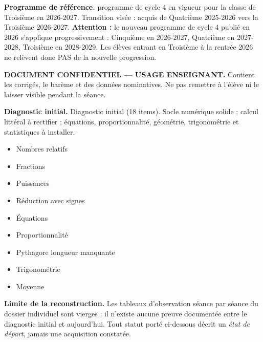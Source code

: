 \documentclass[10pt,a4paper]{article}
\begin{document}
\begin{methodbox}\small\textbf{Programme de référence.} programme de cycle 4 en vigueur pour la classe de Troisième en 2026-2027. Transition visée : acquis de Quatrième 2025-2026 vers la Troisième 2026-2027. \textbf{Attention :} le nouveau programme de cycle 4 publié en 2026 s'applique progressivement : Cinquième en 2026-2027, Quatrième en 2027-2028, Troisième en 2028-2029. Les élèves entrant en Troisième à la rentrée 2026 ne relèvent donc PAS de la nouvelle progression.\end{methodbox}
\begin{keybox}\textbf{DOCUMENT CONFIDENTIEL --- USAGE ENSEIGNANT.} Contient les corrigés, le barème et des données nominatives. Ne pas remettre à l'élève ni le laisser visible pendant la séance.\end{keybox}
\begin{methodbox}
\textbf{Diagnostic initial.} Diagnostic initial (18 items). Socle numérique solide ; calcul littéral à rectifier ; équations, proportionnalité, géométrie, trigonométrie et statistiques à installer.
\end{methodbox}
\begin{itemize}\item Nombres relatifs\item Fractions\item Puissances\end{itemize}
\begin{itemize}\item Réduction avec signes\item Équations\item Proportionnalité\item Pythagore longueur manquante\item Trigonométrie\item Moyenne\end{itemize}
\begin{warningbox}\textbf{Limite de la reconstruction.} Les tableaux d'observation séance par séance du dossier individuel sont vierges : il n'existe aucune preuve documentée entre le diagnostic initial et aujourd'hui. Tout statut porté ci-dessous décrit un \emph{état de départ}, jamais une acquisition constatée.\end{warningbox}
\end{document}
